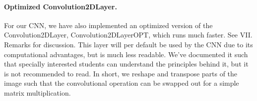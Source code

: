 \documentclass[%
oneside,                 %
final,                   %
10pt]{article}
\begin{document}
\paragraph{Optimized Convolution2DLayer.}
For our CNN, we have also implemented an optimized version of the
Convolution2DLayer, Convolution2DLayerOPT, which runs much faster. See
VII. Remarks for discussion. This layer will per default be used by
the CNN due to its computational advantages, but is much less
readable. We've documented it such that specially interested students
can understand the principles behind it, but it is not recommended to
read. In short, we reshape and transpose parts of the image such that
the convolutional operation can be swapped out for a simple matrix
multiplication.
\end{document}
